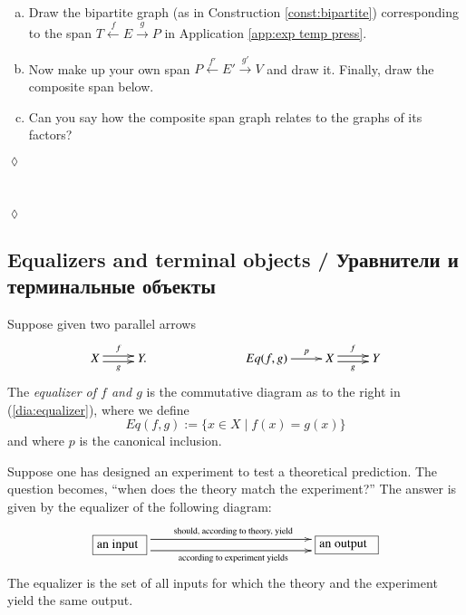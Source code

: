 \documentclass[a4paper]{book}
\def\tn{\textnormal}
\def\|{{\;|\;}}
\newcommand{\obox}[3]{\stackrel{#1}{\fbox{\parbox{#2}{#3}}}}
\newcommand{\To}[1]{\xrightarrow{#1}}
\newcommand{\From}[1]{\xleftarrow{#1}}
\theoremstyle{myth}
\newtheorem{exampleENG}[envENG]{\begin{english}Example\end{english}}
\newtheorem{excENG}[envENG]{\begin{english}Exercise\end{english}}
\newtheorem{definitionENG}[envENG]{\begin{english}Definition\end{english}}
\newenvironment{exerciseENG}{\begin{excENG}}{\hspace*{\fill}$\lozenge$\end{excENG}}
\newtheorem{constructionRUS}[envRUS]{\begin{russian}Конструкция\end{russian}}
\newtheorem{excRUS}[envRUS]{\begin{russian}Упражнение\end{russian}}
\newtheorem{definitionRUS}[envRUS]{\begin{russian}Определение\end{russian}}
\newenvironment{exerciseRUS}{\begin{excRUS}}{\hspace*{\fill}$\lozenge$\end{excRUS}}
\def\sexc{\begin{enumerate}[a.)]\setlength{\itemsep}{.1cm}\setlength{\parskip}{.1cm}\item}
\def\next{\item}
\def\endsexc{\end{enumerate}}
\begin{document}
\begin{english}
\begin{constructionRUS}\label{const:bipartite}
\begin{russian} \end{russian}
\end{constructionRUS}

\begin{exerciseENG}~
\sexc Draw the bipartite graph (as in Construction \ref{const:bipartite}) corresponding to the span $T\From{f}E\To{g}P$ in Application \ref{app:exp temp press}.
\next Now make up your own span $P\From{f'}E'\To{g'}V$ and draw it. Finally, draw the composite span below. 
\next Can you say how the composite span graph relates to the graphs of its factors?
\endsexc
\end{exerciseENG}

\begin{exerciseRUS}~
\begin{russian} \end{russian}
\end{exerciseRUS}


\subsection{Equalizers and terminal objects / Уравнители и терминальные объекты}

\begin{definitionENG}\label{def:equalizer}
Suppose given two parallel arrows 
\begin{align}\label{dia:equalizer}
\xymatrix{X\ar@<.5ex>[r]^f\ar@<-.5ex>[r]_g&Y.}\hspace{1in}\xymatrix{Eq(f,g)\ar[r]^-p&X\ar@<.5ex>[r]^f\ar@<-.5ex>[r]_g&Y}
\end{align}
The {\em equalizer of $f$ and $g$} is the commutative diagram as to the right in (\ref{dia:equalizer}), where we define $$Eq(f,g):=\{x\in X\|f(x)=g(x)\}$$ and where $p$ is the canonical inclusion.
\end{definitionENG}

\begin{definitionRUS}\label{def:equalizer}
\begin{russian} \end{russian}
\end{definitionRUS}

\begin{exampleENG}
Suppose one has designed an experiment to test a theoretical prediction. The question becomes, “when does the theory match the experiment?” The answer is given by the equalizer of the following diagram:
$$\xymatrix{
\obox{}{.5in}{an input}\ar@<1ex>[rr]^{\tn{should, according to theory, yield}}\ar@<-1ex>[rr]_{\tn{according to experiment yields}}&\hspace{1in}&\obox{}{.6in}{an output}
}$$
The equalizer is the set of all inputs for which the theory and the experiment yield the same output.
\end{exampleENG}


\end{english}
\end{document}
